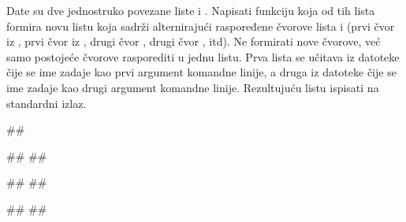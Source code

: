 \begin{Exercise}[label=610]
Date su dve jednostruko povezane liste  i . Napisati funkciju koja od 
tih lista formira novu listu  koja sadrži alternirajući raspoređene čvorove 
lista  i  (prvi čvor iz , prvi čvor iz , drugi čvor ,
drugi čvor , itd). Ne formirati nove čvorove, već samo postojeće čvorove 
rasporediti u jednu listu. Prva lista se učitava iz datoteke čije se ime zadaje kao prvi argument komandne linije, a druga iz datoteke čije se ime zadaje kao 
drugi argument komandne linije. Rezultujuću listu ispisati na standardni izlaz. 


\noindent
\begin{miditest}
\begin{test}{1}
##

##
##

##
##

#\naslovIzlaz#
##
\end{test}
\end{miditest}
\end{Exercise}

